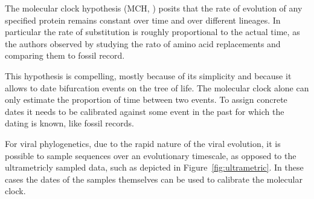 The molecular clock hypothesis (MCH, \cite{Zuckerkandl1962}) posits that the rate of evolution of any specified protein remains constant over time and over different lineages.
In particular the rate of substitution is roughly proportional to the actual time, as the authors observed by studying the rato of amino acid replacements and comparing them to fossil record.


This hypothesis is compelling, mostly because of its simplicity and because it allows to date bifurcation events on the tree of life.
The molecular clock alone can only estimate the proportion of time between two events. 
To assign concrete dates it needs to be calibrated against some event in the past for which the dating is known, like fossil records.

For viral phylogenetics, due to the rapid nature of the viral evolution, it is possible to sample sequences over an evolutionary timescale, as opposed to the ultrametricly sampled data, such as depicted in Figure~\ref{fig:ultrametric}.
In these cases the dates of the samples themselves can be used to calibrate the molecular clock.



